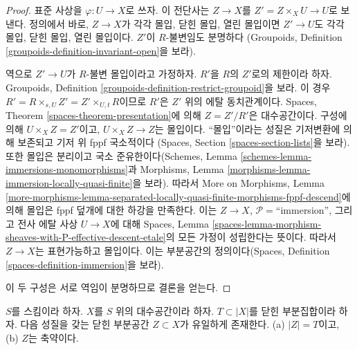 \begin{proof}
표준 사상을 $\varphi : U \to X$로 쓰자. 이 전단사는 $Z \to X$를
$Z' = Z \times_X U \to U$로 보낸다. 정의에서 바로, $Z \to X$가
각각 몰입, 닫힌 몰입, 열린 몰입이면 $Z' \to U$도 각각 몰입,
닫힌 몰입, 열린 몰입이다. $Z'$이 $R$-불변임도 분명하다
(Groupoids, Definition \ref{groupoids-definition-invariant-open}을 보라).

\medskip\noindent
역으로 $Z' \to U$가 $R$-불변 몰입이라고 가정하자.
$R'$을 $R$의 $Z'$로의 제한이라 하자. Groupoids, Definition
\ref{groupoids-definition-restrict-groupoid}을 보라.
이 경우 $R' = R \times_{s, U} Z' = Z' \times_{U, t} R$이므로
$R'$은 $Z'$ 위의 에탈 동치관계이다. Spaces, Theorem
\ref{spaces-theorem-presentation}에 의해 $Z = Z'/R'$은 대수공간이다.
구성에 의해 $U \times_X Z = Z'$이고,
$U \times_X Z \to Z$는 몰입이다.
``몰입''이라는 성질은 기저변환에 의해 보존되고 기저 위 fppf 국소적이다
(Spaces, Section \ref{spaces-section-lists}을 보라).
또한 몰입은 분리이고 국소 준유한이다(Schemes, Lemma
\ref{schemes-lemma-immersions-monomorphisms}과 Morphisms, Lemma
\ref{morphisms-lemma-immersion-locally-quasi-finite}을 보라).
따라서 More on Morphisms, Lemma
\ref{more-morphisms-lemma-separated-locally-quasi-finite-morphisms-fppf-descend}에
의해 몰입은 fppf 덮개에 대한 하강을 만족한다. 이는 $Z \to X$,
$\mathcal{P}=$``immersion'', 그리고 전사 에탈 사상 $U \to X$에 대해
Spaces, Lemma
\ref{spaces-lemma-morphism-sheaves-with-P-effective-descent-etale}의 모든
가정이 성립한다는 뜻이다. 따라서 $Z \to X$는 표현가능하고 몰입이다.
이는 부분공간의 정의이다(Spaces, Definition
\ref{spaces-definition-immersion}을 보라).

\medskip\noindent
이 두 구성은 서로 역임이 분명하므로 결론을 얻는다.
\end{proof}

\begin{lemma}
\label{lemma-reduced-closed-subspace}
$S$를 스킴이라 하자.
$X$를 $S$ 위의 대수공간이라 하자.
$T \subset |X|$를 닫힌 부분집합이라 하자.
다음 성질을 갖는 닫힌 부분공간 $Z \subset X$가 유일하게 존재한다.
(a) $|Z| = T$이고, (b) $Z$는 축약이다.
\end{lemma}

